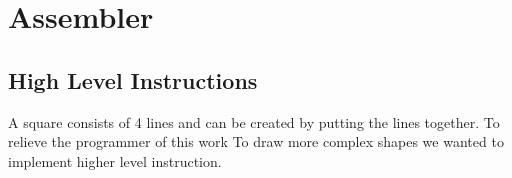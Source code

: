 \section{Assembler}


\subsection{High Level Instructions}
A square consists of 4 lines and can be created by putting the lines together.
To relieve the programmer of this work
To draw more complex shapes we wanted to implement higher level instruction.
